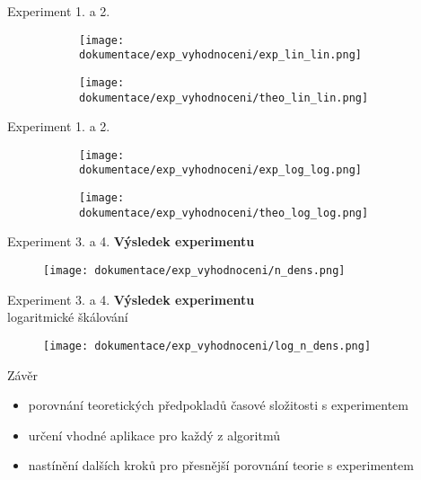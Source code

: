 \documentclass[xcolor=dvipsnames,table,10pt]{beamer}
\begin{document}
\begin{frame}{Experiment 1. a 2.}
    \begin{figure}[h!]
        \centering
        \begin{subfigure}{0.49\textwidth}
            \texttt{[image: dokumentace/exp\_vyhodnoceni/exp\_lin\_lin.png]}
        \end{subfigure}
        \hfill
        \begin{subfigure}{0.49\textwidth}
            \texttt{[image: dokumentace/exp\_vyhodnoceni/theo\_lin\_lin.png]}
        \end{subfigure}
    \end{figure}
\end{frame}
\begin{frame}{Experiment 1. a 2.}
    \begin{figure}[h!]
        \centering
        \begin{subfigure}{0.49\textwidth}
            \texttt{[image: dokumentace/exp\_vyhodnoceni/exp\_log\_log.png]}
        \end{subfigure}
        \hfill
        \begin{subfigure}{0.49\textwidth}
            \texttt{[image: dokumentace/exp\_vyhodnoceni/theo\_log\_log.png]}
        \end{subfigure}
    \end{figure}
\end{frame}

\begin{frame}{Experiment 3. a 4.}
    \textbf{V\'ysledek experimentu}
    \begin{figure}
        \centering
        \texttt{[image: dokumentace/exp\_vyhodnoceni/n\_dens.png]}
    \end{figure}
    
\end{frame}

\begin{frame}{Experiment 3. a 4.}
    \textbf{V\'ysledek experimentu}\\
    logaritmick\'e \v{s}k\'alov\'an\'i
    \begin{figure}
        \centering
        \texttt{[image: dokumentace/exp\_vyhodnoceni/log\_n\_dens.png]}
    \end{figure}
    
\end{frame}

\begin{frame}{Z\'av\v{e}r}
    \begin{itemize}
        \item porovn\'an\'i teoretick\'ych p\v{r}edpoklad\r{u} \v{c}asov\'e slo\v{z}itosti s experimentem\\[15pt]
        \item ur\v{c}en\'i vhodn\'e aplikace pro ka\v{z}d\'y z algoritm\r{u}\\[15pt]
        \item nast\'in\v{e}n\'i dal\v{s}\'ich krok\r{u} pro p\v{r}esn\v{e}j\v{s}\'i porovn\'an\'i teorie s experimentem
    \end{itemize}
\end{frame}


\end{document}
